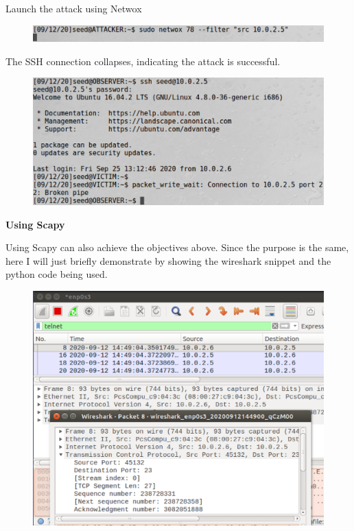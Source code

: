 \documentclass[12pt]{article}
\begin{document}
\noindent
Launch the attack using Netwox

\begin{figure}[H]
    \centering
    \includegraphics[width=1\textwidth]{tcp-telnet-attack.png}
\end{figure}

\noindent
The SSH connection collapses, indicating the attack is successful.

\begin{figure}[H]
    \centering
    \includegraphics[width=1\textwidth]{tcp-sshnet-success.png}
\end{figure}



\newpage

\begin{center}
    \textbf{Using Scapy}
\end{center}

\noindent
Using Scapy can also achieve the objectives above. Since the purpose is the same,
here I will just briefly demonstrate by showing the wireshark snippet and
the python code being used.

\begin{figure}[H]
    \centering
    \includegraphics[width=1\textwidth]{tcp-wireshark.png}
\end{figure}
\end{document}
